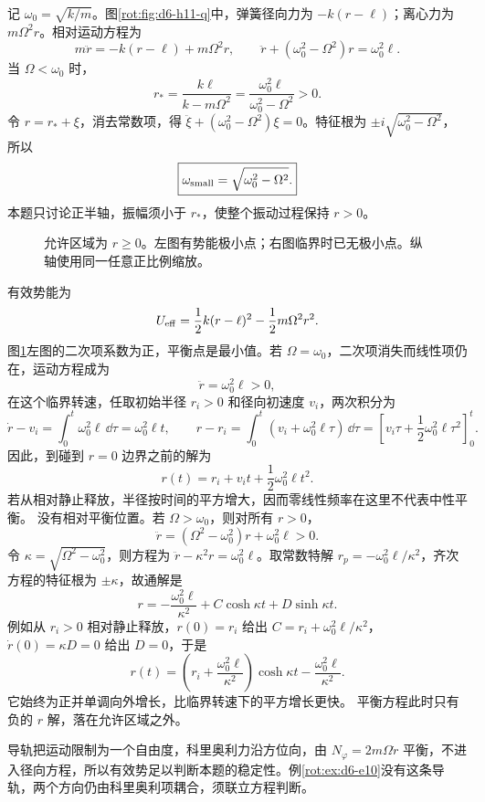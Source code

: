 \begin{solution}
记 $\omega_0=\sqrt{k/m}$。图\ref{rot:fig:d6-h11-q}中，弹簧径向力为 $-k(r-\ell)$；离心力为 $m\Omega^2r$。相对运动方程为
\[
m\ddot r=-k(r-\ell)+m\Omega^2r,
\qquad
\ddot r+(\omega_0^2-\Omega^2)r=\omega_0^2\ell.
\]
当 $\Omega<\omega_0$ 时，
\[
\boxed{r_* =\frac{k\ell}{k-m\Omega^2}
=\frac{\omega_0^2\ell}{\omega_0^2-\Omega^2}>0.}
\]
令 $r=r_*+\xi$，消去常数项，得 $\ddot\xi+(\omega_0^2-\Omega^2)\xi=0$。特征根为 $\pm i\sqrt{\omega_0^2-\Omega^2}$，所以
\[
\boxed{\omega_{\rm small}=\sqrt{\omega_0^2-\Omega^2}.}
\]
本题只讨论正半轴，振幅须小于 $r_*$，使整个振动过程保持 $r>0$。
\begin{figure}[H]\centering
{}
\caption{允许区域为 $r\ge0$。左图有势能极小点；右图临界时已无极小点。纵轴使用同一任意正比例缩放。}\label{rot:fig:d6-h11-s}
\end{figure}
有效势能为
\[
U_{\rm eff}=\frac12k(r-\ell)^2-\frac12m\Omega^2r^2.
\]
图\ref{rot:fig:d6-h11-s}左图的二次项系数为正，平衡点是最小值。若 $\Omega=\omega_0$，二次项消失而线性项仍在，运动方程成为
\[
\ddot r=\omega_0^2\ell>0,
\]
在这个临界转速，任取初始半径 $r_i>0$ 和径向初速度 $v_i$，两次积分为
\[
\dot r-v_i=\int_0^t\omega_0^2\ell\,\dd\tau=\omega_0^2\ell t,\qquad
r-r_i=\int_0^t(v_i+\omega_0^2\ell\tau)\,\dd\tau
=\left[v_i\tau+\frac12\omega_0^2\ell\tau^2\right]_0^t.
\]
因此，到碰到 $r=0$ 边界之前的解为
\[
r(t)=r_i+v_it+\frac12\omega_0^2\ell t^2.
\]
若从相对静止释放，半径按时间的平方增大，因而零线性频率在这里不代表中性平衡。
没有相对平衡位置。若 $\Omega>\omega_0$，则对所有 $r>0$，
\[
\ddot r=(\Omega^2-\omega_0^2)r+\omega_0^2\ell>0.
\]
令 $\kappa=\sqrt{\Omega^2-\omega_0^2}$，则方程为 $\ddot r-\kappa^2r=\omega_0^2\ell$。取常数特解 $r_p=-\omega_0^2\ell/\kappa^2$，齐次方程的特征根为 $\pm\kappa$，故通解是
\[
r=-\frac{\omega_0^2\ell}{\kappa^2}+C\cosh\kappa t+D\sinh\kappa t.
\]
例如从 $r_i>0$ 相对静止释放，$r(0)=r_i$ 给出 $C=r_i+\omega_0^2\ell/\kappa^2$，$\dot r(0)=\kappa D=0$ 给出 $D=0$，于是
\[
r(t)=\left(r_i+\frac{\omega_0^2\ell}{\kappa^2}\right)\cosh\kappa t
-\frac{\omega_0^2\ell}{\kappa^2}.
\]
它始终为正并单调向外增长，比临界转速下的平方增长更快。
平衡方程此时只有负的 $r$ 解，落在允许区域之外。

导轨把运动限制为一个自由度，科里奥利力沿方位向，由 $N_\varphi=2m\Omega\dot r$ 平衡，不进入径向方程，所以有效势足以判断本题的稳定性。例\ref{rot:ex:d6-e10}没有这条导轨，两个方向仍由科里奥利项耦合，须联立方程判断。
\end{solution}


